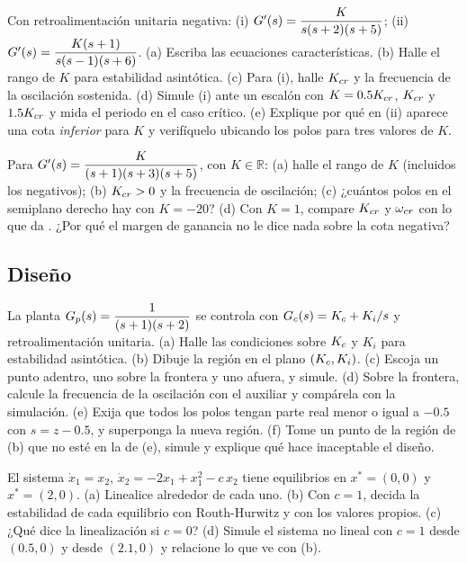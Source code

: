 \begin{problema}\label{prob:es-critica}
Con retroalimentación unitaria negativa: (i) $G'(s)=\dfrac{K}{s(s+2)(s+5)}$; (ii) $G'(s)=\dfrac{K(s+1)}{s(s-1)(s+6)}$. (a) Escriba las ecuaciones características. (b) Halle el rango de $K$ para estabilidad asintótica. (c) Para (i), halle $K_{cr}$ y la frecuencia de la oscilación sostenida. (d) \etiquetaM{} Simule (i) ante un escalón con $K=0.5K_{cr}$, $K_{cr}$ y $1.5K_{cr}$ y mida el periodo en el caso crítico. (e) Explique por qué en (ii) aparece una cota \emph{inferior} para $K$ y verifíquelo ubicando los polos para tres valores de $K$.
\end{problema}

\begin{problema}\label{prob:es-bode}
Para $G'(s)=\dfrac{K}{(s+1)(s+3)(s+5)}$, con $K\in\mathbb{R}$: (a) halle el rango de $K$ (incluidos los negativos); (b) $K_{cr}>0$ y la frecuencia de oscilación; (c) ¿cuántos polos en el semiplano derecho hay con $K=-20$? (d) \etiquetaM{} Con $K=1$, compare $K_{cr}$ y $\omega_{cr}$ con lo que da . ¿Por qué el margen de ganancia no le dice nada sobre la cota negativa?
\end{problema}

\subsection*{Diseño}

\begin{problema}[región de un PI]\label{prob:es-pi}
La planta $G_p(s)=\dfrac{1}{(s+1)(s+2)}$ se controla con $G_c(s)=K_c+K_i/s$ y retroalimentación unitaria. (a) Halle las condiciones sobre $K_c$ y $K_i$ para estabilidad asintótica. (b) Dibuje la región en el plano $(K_c,K_i)$. (c) \etiquetaM{} Escoja un punto adentro, uno sobre la frontera y uno afuera, y simule. (d) Sobre la frontera, calcule la frecuencia de la oscilación con el auxiliar y compárela con la simulación. (e) Exija que todos los polos tengan parte real menor o igual a $-0.5$ con $s=z-0.5$, y superponga la nueva región. (f) \etiquetaM{} Tome un punto de la región de (b) que no esté en la de (e), simule y explique qué hace inaceptable el diseño.
\end{problema}

\begin{problema}\label{prob:es-local}
El sistema $\dot x_1=x_2$, $\dot x_2=-2x_1+x_1^2-c\,x_2$ tiene equilibrios en $x^*=(0,0)$ y $x^*=(2,0)$. (a) Linealice alrededor de cada uno. (b) Con $c=1$, decida la estabilidad de cada equilibrio con Routh-Hurwitz y con los valores propios. (c) ¿Qué dice la linealización si $c=0$? (d) \etiquetaM{} Simule el sistema no lineal con $c=1$ desde $(0.5,0)$ y desde $(2.1,0)$ y relacione lo que ve con (b).
\end{problema}

